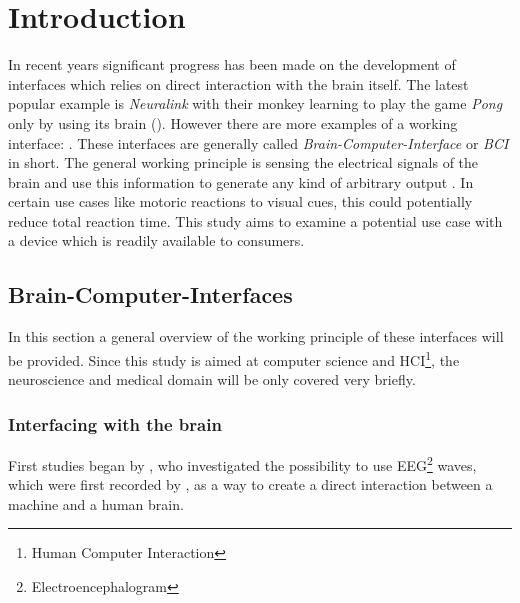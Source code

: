 
    \chapter{Introduction}



        In recent years significant progress has been made on the development of interfaces which relies on direct interaction with the brain itself.  The latest popular example is \textit{Neuralink} with their monkey learning to play the game \textit{Pong} only by using its brain (\cite{Neuralink.2021}). However there are more examples of a working interface: .
        These interfaces are generally called \textit{Brain-Computer-Interface} or \textit{BCI} in short. The general working principle is sensing the electrical signals of the brain and use this information to generate any kind of arbitrary output . 
        In certain use cases like motoric reactions to visual cues, this could potentially reduce total reaction time. This study aims to examine a potential use case with a device which is readily available to consumers.
        

        \section{Brain-Computer-Interfaces}

            In this section a general overview of the working principle of these interfaces will be provided. Since this study is aimed at computer science and HCI\footnote{Human Computer Interaction}, the neuroscience and medical domain will be only covered very briefly.

            \subsection{Interfacing with the brain}


                First studies began by \cite{Vidal.1973}, who investigated the possibility to use EEG\footnote{Electroencephalogram} waves, which were first recorded by \cite{Berger.1929}, as a way to create a direct interaction between a machine and a human brain. 

